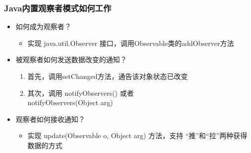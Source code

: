 \documentclass[compress]{beamer}
\begin{document}
{

\begin{frame}
  \frametitle{Java内置观察者模式如何工作}

   {
    \begin{itemize} 
      \item 如何成为观察者？
        \begin{itemize}
          \item [] 实现 java.util.Observer 接口，调用Observable类的addObserver方法
        \end{itemize}
      \item 被观察者如何发送数据改变的通知？
        \begin{enumerate}
          \item 首先，调用setChanged方法，通告该对象状态已改变
          \item 其次，调用 notifyObservers()  或者\\
            notifyObservers(Object arg)
        \end{enumerate}

      \item 观察者如何接收通知？
        \begin{itemize}
          \item [] 实现 update(Observable o, Object arg) 方法，支持
            ``推''和``拉''两种获得数据的方式
        \end{itemize}

    \end{itemize}
  }

   {
    \verbobservable
  }
\end{frame}
}
\end{document}
